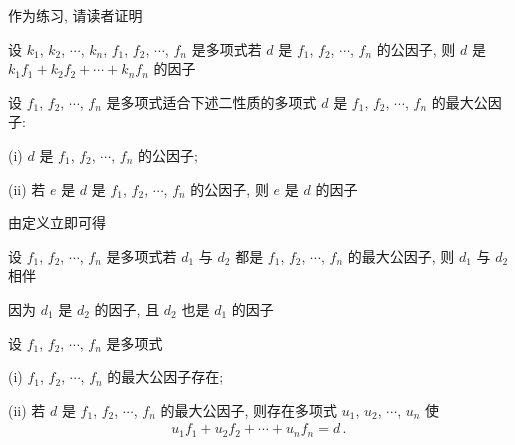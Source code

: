 作为练习, 请读者证明
\begin{proposition}
    设 $k_1$, $k_2$, $\cdots$, $k_n$, $f_1$, $f_2$, $\cdots$, $f_n$ 是多项式\period 若 $d$ 是 $f_1$, $f_2$, $\cdots$, $f_n$ 的公因子, 则 $d$ 是 $k_1 f_1 + k_2 f_2 + \cdots + k_n f_n$ 的因子\period
\end{proposition}

\begin{definition}
    设 $f_1$, $f_2$, $\cdots$, $f_n$ 是多项式\period 适合下述二性质的多项式 $d$ 是 $f_1$, $f_2$, $\cdots$, $f_n$ 的最大公因子:

    (i) $d$ 是 $f_1$, $f_2$, $\cdots$, $f_n$ 的公因子;

    (ii) 若 $e$ 是 $d$ 是 $f_1$, $f_2$, $\cdots$, $f_n$ 的公因子, 则 $e$ 是 $d$ 的因子\period
\end{definition}

由定义立即可得
\begin{proposition}
    设 $f_1$, $f_2$, $\cdots$, $f_n$ 是多项式\period 若 $d_1$ 与 $d_2$ 都是 $f_1$, $f_2$, $\cdots$, $f_n$ 的最大公因子, 则 $d_1$ 与 $d_2$ 相伴\period
\end{proposition}

\begin{pf}
    因为 $d_1$ 是 $d_2$ 的因子, 且 $d_2$ 也是 $d_1$ 的因子\period
\end{pf}

\begin{proposition}
    设 $f_1$, $f_2$, $\cdots$, $f_n$ 是多项式\period

    (i) $f_1$, $f_2$, $\cdots$, $f_n$ 的最大公因子存在;

    (ii) 若 $d$ 是 $f_1$, $f_2$, $\cdots$, $f_n$ 的最大公因子, 则存在多项式 $u_1$, $u_2$, $\cdots$, $u_n$ 使
    \begin{align*}
        u_1 f_1 + u_2 f_2 + \cdots + u_n f_n = d \period
    \end{align*}
\end{proposition}

